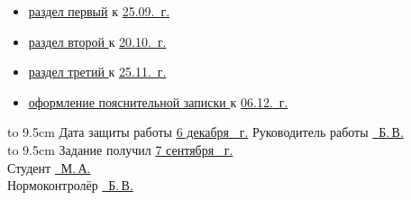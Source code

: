 \begin{itemize}
\item \uline{раздел первый\hfill}
  к \uline{25.09.\the\year~г. }
\item \uline{раздел второй \hfill} к \uline{20.10.\the\year~г.}
\item \uline{раздел третий \hfill} к \uline{25.11.\the\year~г.}
\item \uline{оформление пояснительной записки \hfill} к \uline{06.12.\the\year~г.}

\end{itemize}
\hbox to 9.5cm {Дата защиты работы \uline{\hfill 6 декабря \the\year~г.}}
Руководитель работы \uline{~Б.\,В.}\\
\hbox to 9.5cm {Задание получил \uline{\hfill7 сентября \the\year~г.}}\\
Студент    \uline{~М.\,А.}\\
Нормоконтролёр    \uline{~Б.\,В.}\\
\newpage

